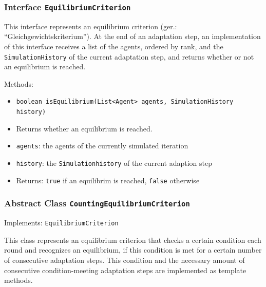 \documentclass[parskip=full,11pt]{scrartcl}
\begin{document}
\subsubsection{Interface \texttt{EquilibriumCriterion}}

This interface represents an equilibrium criterion (ger.: \enquote{Gleichgewichtskriterium}). At the end of an adaptation step, an implementation of this interface receives a list of the agents, ordered by rank, and the \texttt{SimulationHistory} of the current adaptation step, and returns whether or not an equilibrium is reached.

Methods:
\begin{itemize}\itemsep -10pt
\item \texttt{boolean isEquilibrium(List<Agent> agents, SimulationHistory history)}
\item[] Returns whether an equilibrium is reached.
\item[] \texttt{agents}: the agents of the currently simulated iteration
\item[] \texttt{history}: the \texttt{Simulationhistory} of the current adaption step
\item[] Returns: \texttt{true} if an equilibrim is reached, \texttt{false} otherwise
\end{itemize}

\subsubsection{Abstract Class \texttt{CountingEquilibriumCriterion}}
Implements: \texttt{EquilibriumCriterion}

This class represents an equilibrium criterion that checks a certain condition each round and recognizes an equilibrium, if this condition is met for a certain number of consecutive adaptation steps. This condition and the necessary amount of consecutive condition-meeting adaptation steps are implemented as template methods.
\end{document}

